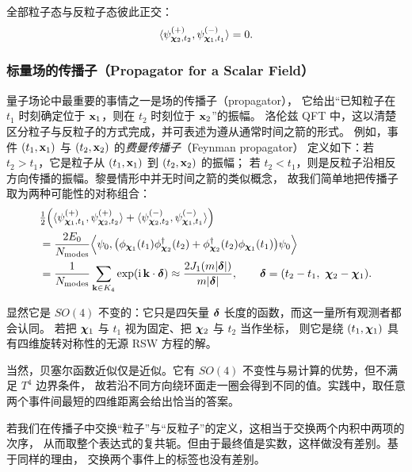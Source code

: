 全部粒子态与反粒子态彼此正交：
\begin{equation*}
\langle\psi^{(+)}_{\boldsymbol{\chi}_{2},t_{2}},\psi^{(-)}_{\boldsymbol{\chi}_{1},t_{1}}\rangle=0 .
\end{equation*}

\subsubsection{标量场的传播子（Propagator for a Scalar Field）}

量子场论中最重要的事情之一是场的传播子（propagator），
它给出“已知粒子在 $t_{1}$ 时刻确定位于 $\mathbf{x}_{1}$，则在 $t_{2}$ 时刻位于 $\mathbf{x}_{2}$”的振幅。
洛伦兹 QFT 中，这以清楚区分粒子与反粒子的方式完成，并可表述为遵从通常时间之箭的形式。
例如，事件 $(t_{1},\mathbf{x}_{1})$ 与 $(t_{2},\mathbf{x}_{2})$ 的\emph{费曼传播子}（Feynman propagator）
定义如下：若 $t_{2}>t_{1}$，它是粒子从 $(t_{1},\mathbf{x}_{1})$ 到 $(t_{2},\mathbf{x}_{2})$ 的振幅；
若 $t_{2}<t_{1}$，则是反粒子沿相反方向传播的振幅。黎曼情形中并无时间之箭的类似概念，
故我们简单地把传播子取为两种可能性的对称组合：
\begin{align*}
&\tfrac12\Bigl(\langle\psi^{(+)}_{\boldsymbol{\chi}_{1},t_{1}},\psi^{(+)}_{\boldsymbol{\chi}_{2},t_{2}}\rangle
+\langle\psi^{(-)}_{\boldsymbol{\chi}_{2},t_{2}},\psi^{(-)}_{\boldsymbol{\chi}_{1},t_{1}}\rangle\Bigr)\\
&=\frac{2E_{0}}{N_{\text{modes}}}\Bigl\langle\psi_{0},
\bigl(\phi_{\boldsymbol{\chi}_{1}}(t_{1})\phi^{\dagger}_{\boldsymbol{\chi}_{2}}(t_{2})
+\phi^{\dagger}_{\boldsymbol{\chi}_{2}}(t_{2})\phi_{\boldsymbol{\chi}_{1}}(t_{1})\bigr)\psi_{0}\Bigr\rangle\\
&=\frac{1}{N_{\text{modes}}}\sum_{\mathbf{k}\in K_{4}}\exp(\mathrm{i}\,\mathbf{k}\cdot\boldsymbol{\delta})
\approx\frac{2J_{1}(m|\boldsymbol{\delta}|)}{m|\boldsymbol{\delta}|},\qquad
\boldsymbol{\delta}=(t_{2}-t_{1},\ \boldsymbol{\chi}_{2}-\boldsymbol{\chi}_{1}).
\end{align*}


显然它是 $SO(4)$ 不变的：它只是四矢量 $\boldsymbol{\delta}$ 长度的函数，而这一量所有观测者都会认同。
若把 $\boldsymbol{\chi}_{1}$ 与 $t_{1}$ 视为固定、把 $\boldsymbol{\chi}_{2}$ 与 $t_{2}$ 当作坐标，
则它是绕 $(t_{1},\boldsymbol{\chi}_{1})$ 具有四维旋转对称性的无源 RSW 方程的解。

当然，贝塞尔函数近似仅是近似。它有 $SO(4)$ 不变性与易计算的优势，但不满足 $T^{4}$ 边界条件，
故若沿不同方向绕环面走一圈会得到不同的值。实践中，取任意两个事件间最短的四维距离会给出恰当的答案。

若我们在传播子中交换“粒子”与“反粒子”的定义，这相当于交换两个内积中两项的次序，
从而取整个表达式的复共轭。但由于最终值是实数，这样做没有差别。基于同样的理由，
交换两个事件上的标签也没有差别。


